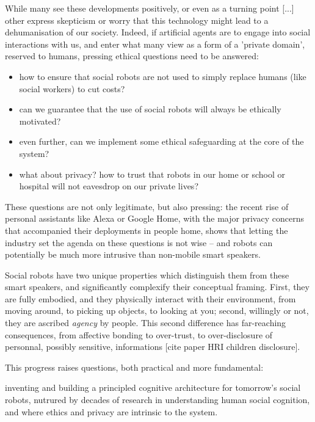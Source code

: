 \documentclass[11pt]{article}
\begin{document}
While many see these developments positively, or even as a turning point [...]
other express skepticism or worry that this technology might lead to a
dehumanisation of our society. Indeed, if artificial agents are to engage into
social interactions with us, and enter what many view as a form of a 'private
domain', reserved to humans, pressing ethical questions need to be answered:

\begin{itemize}
    \item how to ensure that social robots are not used to simply replace humans
        (like social workers) to cut costs?
    \item can we guarantee that the use of social robots will always be ethically motivated?
    \item even further, can we implement some ethical safeguarding at the core
        of the system?
    \item what about privacy? how to trust that robots in our home or school or
        hospital will not eavesdrop on our private lives?
\end{itemize}

These questions are not only legitimate, but also pressing: the recent rise of
personal assistants like Alexa or Google Home, with the major privacy concerns
that accompanied their deployments in people home, shows that letting the
industry set the agenda on these questions is not wise -- and robots can
potentially be much more intrusive than non-mobile smart speakers.

Social robots have two unique properties which distinguish them from these smart
speakers, and significantly complexify their conceptual framing. First, they are
fully embodied, and they physically interact with their environment, from moving
around, to picking up objects, to looking at you; second, willingly or not, they
are ascribed \emph{agency} by people.  This second difference has far-reaching
consequences, from affective bonding to over-trust, to over-disclosure of
personnal, possibly sensitive, informations [cite paper HRI children
disclosure].



This progress raises questions, both practical and more fundamental:

inventing and building a principled cognitive architecture for tomorrow's social
robots, nutrured by decades of research in understanding human social cognition,
and where ethics and privacy are intrinsic to the system.
\end{document}
